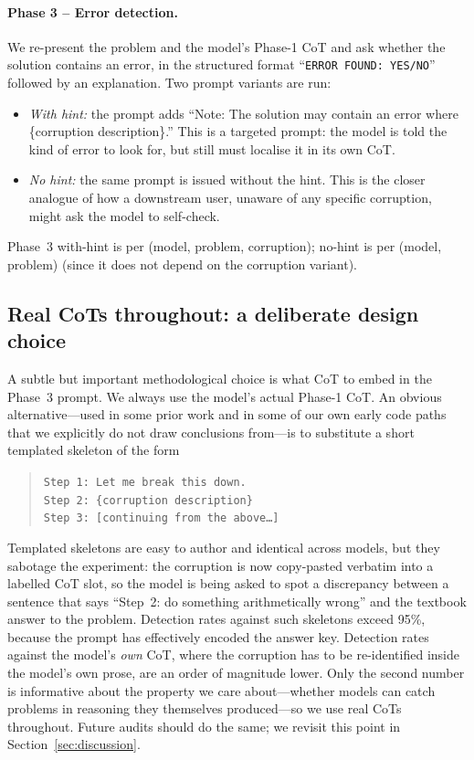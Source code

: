 \documentclass[11pt]{article}
\begin{document}
\paragraph{Phase 3 -- Error detection.} We re-present the problem and the model's Phase-1 CoT and ask whether the solution contains an error, in the structured format ``\texttt{ERROR FOUND: YES/NO}'' followed by an explanation. Two prompt variants are run:
\begin{itemize}
    \item \emph{With hint:} the prompt adds ``Note: The solution may contain an error where \{corruption description\}.'' This is a targeted prompt: the model is told the kind of error to look for, but still must localise it in its own CoT.
    \item \emph{No hint:} the same prompt is issued without the hint. This is the closer analogue of how a downstream user, unaware of any specific corruption, might ask the model to self-check.
\end{itemize}
Phase~3 with-hint is per (model, problem, corruption); no-hint is per (model, problem) (since it does not depend on the corruption variant).

\subsection{Real CoTs throughout: a deliberate design choice}
\label{sec:real-cot}

A subtle but important methodological choice is what CoT to embed in the Phase~3 prompt. We always use the model's actual Phase-1 CoT. An obvious alternative---used in some prior work and in some of our own early code paths that we explicitly do not draw conclusions from---is to substitute a short templated skeleton of the form
\begin{quote}
\small
\texttt{Step 1: Let me break this down.}\\
\texttt{Step 2: \{corruption description\}}\\
\texttt{Step 3: [continuing from the above\dots]}
\end{quote}
Templated skeletons are easy to author and identical across models, but they sabotage the experiment: the corruption is now copy-pasted verbatim into a labelled CoT slot, so the model is being asked to spot a discrepancy between a sentence that says ``Step~2: do something arithmetically wrong'' and the textbook answer to the problem. Detection rates against such skeletons exceed 95\%, because the prompt has effectively encoded the answer key. Detection rates against the model's \emph{own} CoT, where the corruption has to be re-identified inside the model's own prose, are an order of magnitude lower. Only the second number is informative about the property we care about---whether models can catch problems in reasoning they themselves produced---so we use real CoTs throughout. Future audits should do the same; we revisit this point in Section~\ref{sec:discussion}.
\end{document}
